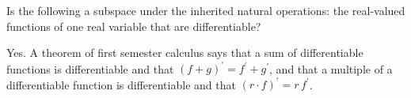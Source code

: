 

\begin{Exercise}[
name={},
title={}, 
difficulty=0,
origin={\cite{JH}}]
Is the following a subspace under the inherited natural operations: 
the real-valued
functions of one real variable that are differentiable?
\end{Exercise}

\begin{Answer}
Yes.
A theorem of first semester calculus says that a sum of differentiable
functions is differentiable and that
\( (f+g)^\prime=f^\prime+g^\prime \), and that 
a multiple of a differentiable
function is differentiable and that \( (r\cdot f)^\prime=r\,f^\prime \). 


\end{Answer}
